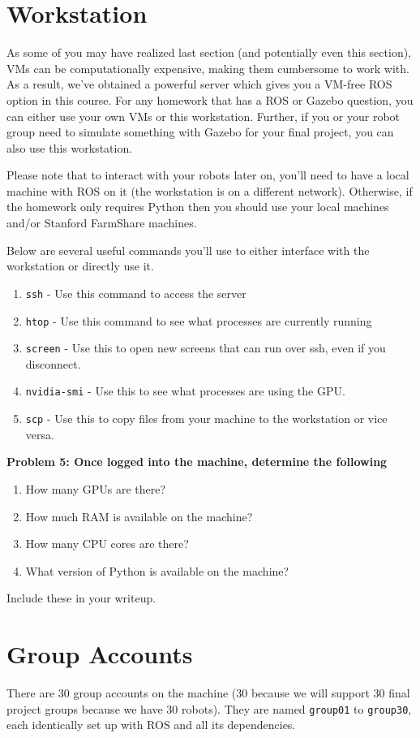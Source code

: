\section{Workstation}
As some of you may have realized last section (and potentially even this section), VMs can be computationally expensive, making them cumbersome to work with. As a result, we've obtained a powerful server which gives you a VM-free ROS option in this course. For any homework that has a ROS or Gazebo question, you can either use your own VMs or this workstation. Further, if you or your robot group need to simulate something with Gazebo for your final project, you can also use this workstation.

Please note that to interact with your robots later on, you'll need to have a local machine with ROS on it (the workstation is on a different network). Otherwise, if the homework only requires Python then you should use your local machines and/or Stanford FarmShare machines.

Below are several useful commands you'll use to either interface with the workstation or directly use it.
\begin{enumerate}
    \item \texttt{ssh} - Use this command to access the server
	\item \texttt{htop} - Use this command to see what processes are currently running
	\item \texttt{screen} - Use this to open new screens that can run over ssh, even if you disconnect.
	\item \texttt{nvidia-smi} - Use this to see what processes are using the GPU.
    \item \texttt{scp} - Use this to copy files from your machine to the workstation or vice versa.
\end{enumerate}

{\bf Problem 5: Once logged into the machine, determine the following
\begin{enumerate}[label=(\alph*)]
    \item How many GPUs are there?
    \item How much RAM is available on the machine?
    \item How many CPU cores are there?
    \item What version of Python is available on the machine?
\end{enumerate}
Include these in your writeup.}

\section{Group Accounts}
There are 30 group accounts on the machine (30 because we will support 30 final project groups because we have 30 robots). They are named \texttt{group01} to \texttt{group30}, each identically set up with ROS and all its dependencies.